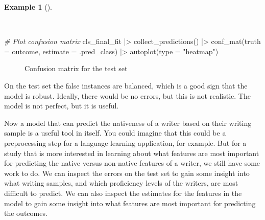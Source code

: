 \documentclass[
  letterpaper,
]{latex/krantz}
\newenvironment{Shaded}{\begin{snugshade}}{\end{snugshade}}
\newcommand{\AttributeTok}[1]{\textcolor[rgb]{0.00,0.00,0.00}{#1}}
\newcommand{\CommentTok}[1]{\textcolor[rgb]{0.00,0.00,0.00}{\textit{#1}}}
\newcommand{\FunctionTok}[1]{\textcolor[rgb]{0.00,0.00,0.00}{#1}}
\newcommand{\NormalTok}[1]{\textcolor[rgb]{0.00,0.00,0.00}{#1}}
\newcommand{\SpecialCharTok}[1]{\textcolor[rgb]{0.00,0.00,0.00}{#1}}
\newcommand{\StringTok}[1]{\textcolor[rgb]{0.00,0.00,0.00}{#1}}
\theoremstyle{definition}
\newtheorem{example}{Example}[chapter]
\theoremstyle{remark}
\begin{document}
\begin{example}[]\protect\hypertarget{exm-predict-class-tune-hyperparameters-evaluate-test-confusion}{}\label{exm-predict-class-tune-hyperparameters-evaluate-test-confusion}

~

\begin{Shaded}
\begin{Highlighting}[]
\CommentTok{\# Plot confusion matrix}
\NormalTok{cls\_final\_fit }\SpecialCharTok{|\textgreater{}}
  \FunctionTok{collect\_predictions}\NormalTok{() }\SpecialCharTok{|\textgreater{}}
  \FunctionTok{conf\_mat}\NormalTok{(}\AttributeTok{truth =}\NormalTok{ outcome, }\AttributeTok{estimate =}\NormalTok{ .pred\_class) }\SpecialCharTok{|\textgreater{}}
  \FunctionTok{autoplot}\NormalTok{(}\AttributeTok{type =} \StringTok{"heatmap"}\NormalTok{)}
\end{Highlighting}
\end{Shaded}

\begin{figure}[!htb]


\caption{\label{fig-predict-class-tune-hyperparameters-evaluate-test-confusion}Confusion
matrix for the test set}

\end{figure}%

\end{example}

On the test set the false instances are balanced, which is a good sign
that the model is robust. Ideally, there would be no errors, but this is
not realistic. The model is not perfect, but it is useful.

Now a model that can predict the nativeness of a writer based on their
writing sample is a useful tool in itself. You could imagine that this
could be a preprocessing step for a language learning application, for
example. But for a study that is more interested in learning about what
features are most important for predicting the native versus non-native
features of a writer, we still have some work to do. We can inspect the
errors on the test set to gain some insight into what writing samples,
and which proficiency levels of the writers, are most difficult to
predict. We can also inspect the estimates for the features in the model
to gain some insight into what features are most important for
predicting the outcomes.
\end{document}
